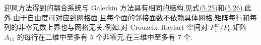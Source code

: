 \begin{note}[最低阶非协调空间迎风方法的矩阵]\label{note:oseen-upwind-matrices}
迎风方法得到的耦合系统与 Galerkin 方法具有相同的结构,见式\hyperref[eq:oseen-fem-algebraic-system]{(5.25)}和\hyperref[eq:oseen-fem-algebraic-matrix-a]{(5.26)}.此外,由于自由度可对应到网格面,且每个面的邻接面数不依赖具体网格,矩阵每行和每列的非零元数上界也与网格无关.例如,对 Crouzeix--Raviart 空间对 $P_1^{\mathrm{nc}}/P_0$,矩阵 $A_{11}$ 的每行在二维中至多有 $5$ 个非零元,在三维中至多有 $7$ 个.
\end{note}

